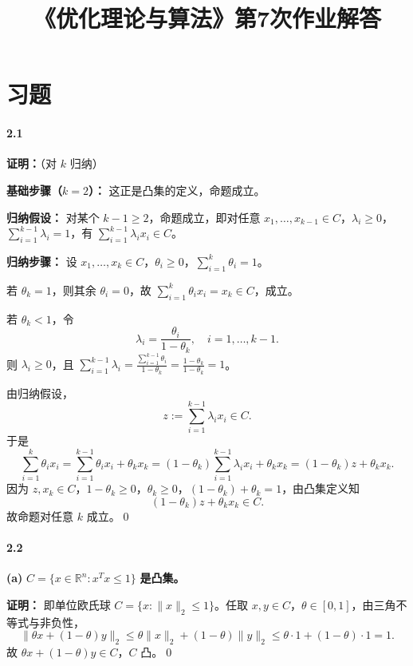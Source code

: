 \documentclass[12pt,a4paper]{article}
\begin{document}
\title{《优化理论与算法》第7次作业解答}
\date{}
\maketitle

\section*{习题}

\paragraph{2.1}

\textbf{证明：}（对 $k$ 归纳）

\textbf{基础步骤（$k=2$）：} 这正是凸集的定义，命题成立。

\textbf{归纳假设：} 对某个 $k-1 \ge 2$，命题成立，即对任意 $x_1,\dots,x_{k-1}\in C$，$\lambda_i\ge0$，$\sum_{i=1}^{k-1}\lambda_i=1$，有 $\sum_{i=1}^{k-1}\lambda_i x_i \in C$。

\textbf{归纳步骤：} 设 $x_1,\dots,x_k\in C$，$\theta_i\ge0$，$\sum_{i=1}^k\theta_i=1$。

若 $\theta_k=1$，则其余 $\theta_i=0$，故 $\sum_{i=1}^k\theta_i x_i = x_k \in C$，成立。

若 $\theta_k < 1$，令
\[
  \lambda_i = \frac{\theta_i}{1-\theta_k}, \quad i=1,\dots,k-1.
\]
则 $\lambda_i\ge0$，且 $\sum_{i=1}^{k-1}\lambda_i = \frac{\sum_{i=1}^{k-1}\theta_i}{1-\theta_k} = \frac{1-\theta_k}{1-\theta_k}=1$。

由归纳假设，
\[
  z := \sum_{i=1}^{k-1}\lambda_i x_i \in C.
\]
于是
\[
  \sum_{i=1}^k \theta_i x_i
  = \sum_{i=1}^{k-1}\theta_i x_i + \theta_k x_k
  = (1-\theta_k)\sum_{i=1}^{k-1}\lambda_i x_i + \theta_k x_k
  = (1-\theta_k)z + \theta_k x_k.
\]
因为 $z, x_k \in C$，$1-\theta_k\ge0$，$\theta_k\ge0$，$(1-\theta_k)+\theta_k=1$，由凸集定义知
\[
  (1-\theta_k)z + \theta_k x_k \in C.
\]
故命题对任意 $k$ 成立。\qed

\paragraph{2.2}

\textbf{(a)} $C=\{x\in\mathbb{R}^n : x^Tx \le 1\}$ \textbf{是凸集。}

\textbf{证明：} 即单位欧氏球 $C=\{x:\|x\|_2\le1\}$。任取 $x,y\in C$，$\theta\in[0,1]$，由三角不等式与非负性，
\[
  \|\theta x+(1-\theta)y\|_2 \le \theta\|x\|_2 + (1-\theta)\|y\|_2 \le \theta\cdot1+(1-\theta)\cdot1=1.
\]
故 $\theta x+(1-\theta)y\in C$，$C$ 凸。\qed
\end{document}
